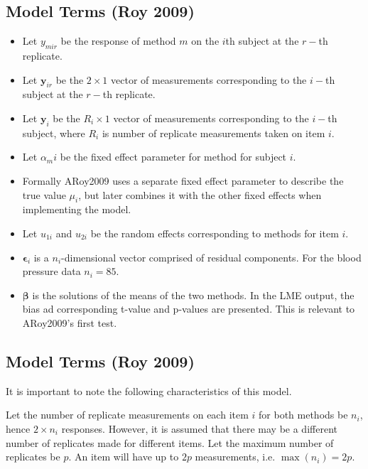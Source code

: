 \documentclass[12pt, a4paper]{report}
\theoremstyle{plain}
\theoremstyle{definition}
\theoremstyle{remark}
\begin{document}
	\subsection{Model Terms (Roy 2009)}
	\begin{itemize}
		\item Let $y_{mir}$ be the response of method $m$ on the $i$th subject
		at the $r-$th replicate.
		\item Let $\boldsymbol{y}_{ir}$ be the $2 \times 1$ vector of measurements
		corresponding to the $i-$th subject at the $r-$th replicate.
		\item Let $\boldsymbol{y}_{i}$ be the $R_i \times 1$ vector of
		measurements corresponding to the $i-$th subject, where $R_i$ is number of replicate measurements taken on item $i$.
		\item Let $\alpha_mi$ be the fixed effect parameter for method for subject $i$.
		\item Formally ARoy2009 uses a separate fixed effect parameter to describe the true value $\mu_i$, but later combines it with the other fixed effects when implementing the model.
		\item Let $u_{1i}$ and $u_{2i}$ be the random effects corresponding to methods for item $i$.
		
		\item $\boldsymbol{\epsilon}_{i}$ is a $n_{i}$-dimensional vector
		comprised of residual components. For the blood pressure data $n_{i} = 85$.
		
		\item $\boldsymbol{\beta}$ is the solutions of the means of the two methods. In the LME output, the bias ad corresponding
		t-value and p-values are presented. This is relevant to ARoy2009's first test.\end{itemize}
	
	

\subsection{Model Terms (Roy 2009)}
It is important to note the following characteristics of this model.

Let the number of replicate measurements on each item $i$ for both methods be $n_i$, hence $2 \times n_i$ responses. However, it is assumed that there may be a different number of replicates made for different items. Let the maximum number of replicates be $p$. An item will have up to $2p$ measurements, i.e. $\max(n_{i}) = 2p$.
\end{document}
